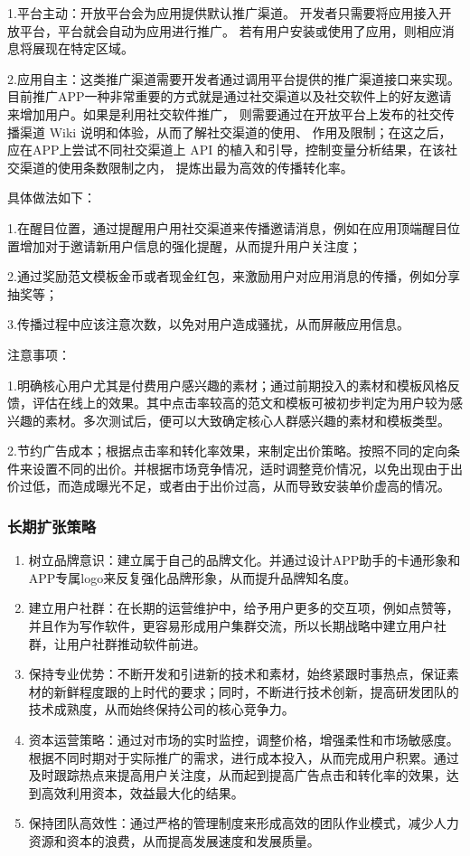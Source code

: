 \documentclass[10pt,letterpaper]{article}
\begin{document}
1.平台主动：开放平台会为应用提供默认推广渠道。 开发者只需要将应用接入开放平台，平台就会自动为应用进行推广。 若有用户安装或使用了应用，则相应消息将展现在特定区域。 

2.应用自主：这类推广渠道需要开发者通过调用平台提供的推广渠道接口来实现。
目前推广APP一种非常重要的方式就是通过社交渠道以及社交软件上的好友邀请来增加用户。如果是利用社交软件推广， 则需要通过在开放平台上发布的社交传播渠道 Wiki 说明和体验，从而了解社交渠道的使用、 作用及限制；在这之后，应在APP上尝试不同社交渠道上 API 的植入和引导，控制变量分析结果，在该社交渠道的使用条数限制之内， 提炼出最为高效的传播转化率。

具体做法如下：

1.在醒目位置，通过提醒用户用社交渠道来传播邀请消息，例如在应用顶端醒目位置增加对于邀请新用户信息的强化提醒，从而提升用户关注度； 

2.通过奖励范文模板金币或者现金红包，来激励用户对应用消息的传播，例如分享抽奖等；

3.传播过程中应该注意次数，以免对用户造成骚扰，从而屏蔽应用信息。

注意事项：

1.明确核心用户尤其是付费用户感兴趣的素材；通过前期投入的素材和模板风格反馈，评估在线上的效果。其中点击率较高的范文和模板可被初步判定为用户较为感兴趣的素材。多次测试后，便可以大致确定核心人群感兴趣的素材和模板类型。

2.节约广告成本；根据点击率和转化率效果，来制定出价策略。按照不同的定向条件来设置不同的出价。并根据市场竞争情况，适时调整竞价情况，以免出现由于出价过低，而造成曝光不足，或者由于出价过高，从而导致安装单价虚高的情况。

\subsubsection{长期扩张策略}
\begin{enumerate}
\item 	树立品牌意识：建立属于自己的品牌文化。并通过设计APP助手的卡通形象和APP专属logo来反复强化品牌形象，从而提升品牌知名度。
\item 	建立用户社群：在长期的运营维护中，给予用户更多的交互项，例如点赞等，并且作为写作软件，更容易形成用户集群交流，所以长期战略中建立用户社群，让用户社群推动软件前进。
\item 	保持专业优势：不断开发和引进新的技术和素材，始终紧跟时事热点，保证素材的新鲜程度跟的上时代的要求；同时，不断进行技术创新，提高研发团队的技术成熟度，从而始终保持公司的核心竞争力。
\item 	资本运营策略：通过对市场的实时监控，调整价格，增强柔性和市场敏感度。根据不同时期对于实际推广的需求，进行成本投入，从而完成用户积累。通过及时跟踪热点来提高用户关注度，从而起到提高广告点击和转化率的效果，达到高效利用资本，效益最大化的结果。
\item 	保持团队高效性：通过严格的管理制度来形成高效的团队作业模式，减少人力资源和资本的浪费，从而提高发展速度和发展质量。
\end{enumerate}
\end{document}
